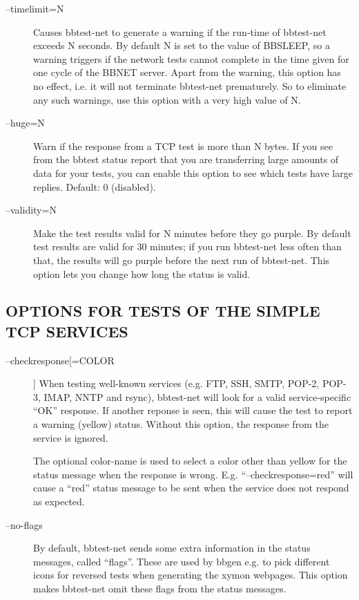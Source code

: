 \begin{description}
 

\item[--timelimit=N] Causes bbtest-net to generate a warning if the
  run-time of bbtest-net exceeds N seconds. By default N is set to the
  value of BBSLEEP, so a warning triggers if the network tests cannot
  complete in the time given for one cycle of the BBNET server. Apart
  from the warning, this option has no effect, i.e. it will not
  terminate bbtest-net prematurely. So to eliminate any such warnings,
  use this option with a very high value of N. 



\item[--huge=N] Warn if the response from a TCP test is more than N
  bytes. If you see from the bbtest status report that you are
  transferring large amounts of data for your tests, you can enable
  this option to see which tests have large replies.   Default: 0
  (disabled). 


 

\item[--validity=N] Make the test results valid for N minutes before
  they go purple. By default test results are valid for 30 minutes; if
  you run bbtest-net less often than that, the results will go purple
  before the next run of bbtest-net. This option lets you change how
  long the status is valid. 


\end{description}

\subsection{OPTIONS FOR TESTS OF THE SIMPLE TCP SERVICES}
\begin{description}
\item[--checkresponse[=COLOR]] When testing well-known services
  (e.g. FTP, SSH, SMTP, POP-2, POP-3, IMAP, NNTP and rsync),
  bbtest-net will look for a valid service-specific ``OK''
  response. If another reponse is seen, this will cause the test to
  report a warning (yellow) status. Without this option, the response
  from the service is ignored.  

 The optional color-name is used to select a color other than yellow
 for the status message when the response is
 wrong. E.g. ``--checkresponse=red'' will cause a ``red'' status
 message to be sent when the service does not respond as expected. 


 

\item[--no-flags] By default, bbtest-net sends some extra information
  in the status messages, called ``flags''. These are used by bbgen
  e.g. to pick different icons for reversed tests when generating the
  xymon webpages. This option makes bbtest-net omit these flags from
  the status messages. 



\end{description}

